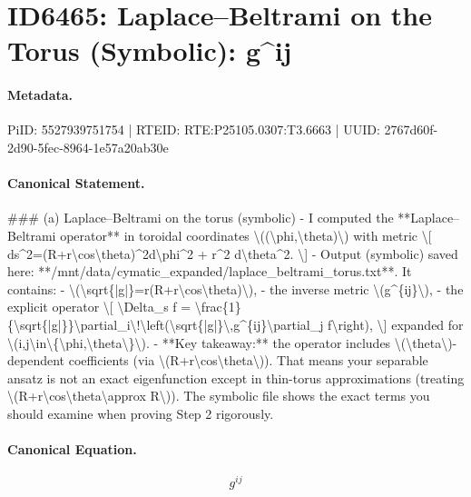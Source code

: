 \section*{ID6465: Laplace–Beltrami on the Torus (Symbolic): g\textasciicircum{}ij}
\paragraph{Metadata.}
PiID: 5527939751754 | RTEID: RTE:P25105.0307:T3.6663 | UUID: 2767d60f-2d90-5fec-8964-1e57a20ab30e

\paragraph{Canonical Statement.}
\#\#\# (a) Laplace–Beltrami on the torus (symbolic) - I computed the **Laplace–Beltrami operator** in toroidal coordinates \textbackslash{}((\textbackslash{}phi,\textbackslash{}theta)\textbackslash{}) with metric \textbackslash{}[ ds\textasciicircum{}2=(R+r\textbackslash{}cos\textbackslash{}theta)\textasciicircum{}2d\textbackslash{}phi\textasciicircum{}2 + r\textasciicircum{}2 d\textbackslash{}theta\textasciicircum{}2. \textbackslash{}] - Output (symbolic) saved here: **/mnt/data/cymatic\_expanded/laplace\_beltrami\_torus.txt**. It contains: - \textbackslash{}(\textbackslash{}sqrt\{|g|\}=r(R+r\textbackslash{}cos\textbackslash{}theta)\textbackslash{}), - the inverse metric \textbackslash{}(g\textasciicircum{}\{ij\}\textbackslash{}), - the explicit operator \textbackslash{}[ \textbackslash{}Delta\_s f = \textbackslash{}frac\{1\}\{\textbackslash{}sqrt\{|g|\}\}\textbackslash{}partial\_i\textbackslash{}!\textbackslash{}left(\textbackslash{}sqrt\{|g|\}\textbackslash{},g\textasciicircum{}\{ij\}\textbackslash{}partial\_j f\textbackslash{}right), \textbackslash{}] expanded for \textbackslash{}(i,j\textbackslash{}in\textbackslash{}\{\textbackslash{}phi,\textbackslash{}theta\textbackslash{}\}\textbackslash{}). - **Key takeaway:** the operator includes \textbackslash{}(\textbackslash{}theta\textbackslash{})-dependent coefficients (via \textbackslash{}(R+r\textbackslash{}cos\textbackslash{}theta\textbackslash{})). That means your separable ansatz is not an exact eigenfunction except in thin-torus approximations (treating \textbackslash{}(R+r\textbackslash{}cos\textbackslash{}theta\textbackslash{}approx R\textbackslash{})). The symbolic file shows the exact terms you should examine when proving Step 2 rigorously.

\paragraph{Canonical Equation.}
\[
g^{ij}
\]

